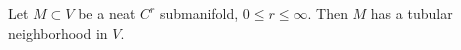 Let $M \subset V$ be a neat $C^r$ submanifold, $0 \leqslant r \leqslant \infty$. Then $M$ has a tubular neighborhood in $V$.
